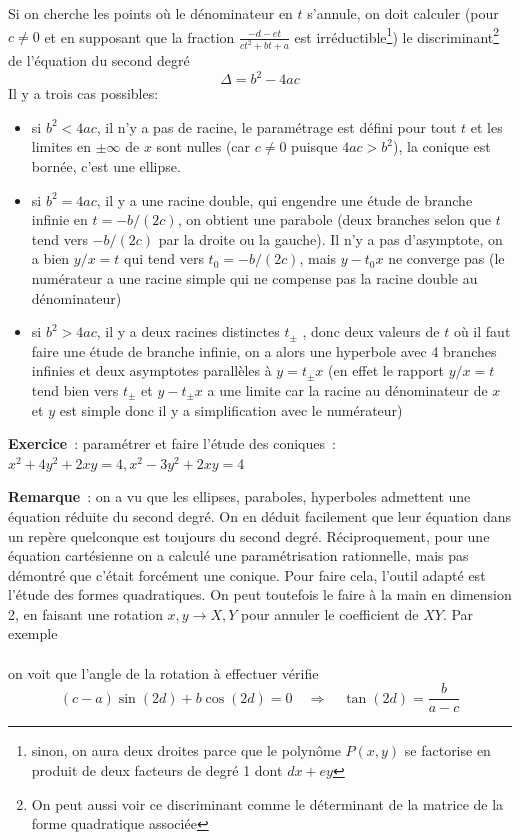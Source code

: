 \documentclass[a4paper,11pt]{article}
\begin{document}
\begin{giacjshere}
Si on cherche les points o\`u le d\'enominateur en $t$ s'annule, on doit
calculer  (pour $c\neq 0$ et en supposant que la fraction
$\frac{-d-et}{ct^2+bt+a}$ est irr\'eductible\footnote{sinon, on 
aura deux droites parce que le
polyn\^ome $P(x,y)$ se factorise en produit de deux facteurs
de degr\'e 1 dont $dx+ey$})
le discriminant\footnote{On peut aussi voir ce discriminant comme le
d\'eterminant de la matrice de la forme quadratique associ\'ee} 
de l'\'equation du second degr\'e
$$ \Delta= b^2-4ac$$
Il y a trois cas possibles: 
\begin{itemize}
\item si $b^2<4ac$, il n'y a pas de racine, le
param\'etrage est d\'efini pour tout $t$ et les limites en $\pm
\infty$ de $x$ sont nulles (car $c \neq 0$ puisque $4ac>b^2$),
la conique est born\'ee, c'est une ellipse.
\item si $b^2=4ac$, il y a une racine double, qui engendre
une \'etude de branche infinie en $t=-b/(2c)$, on
obtient une parabole (deux branches selon que $t$ tend
vers $-b/(2c)$ par la droite ou la gauche). Il n'y a pas
d'asymptote, on a bien $y/x=t$ qui tend vers $t_0=-b/(2c)$,
mais $y-t_0x$ ne converge pas (le num\'erateur a une racine simple
qui ne compense pas la racine double au d\'enominateur)
\item si $b^2>4ac$, il y a deux racines distinctes $t_\pm$ , 
donc deux valeurs de $t$ o\`u il faut faire une \'etude
de branche infinie, on a alors une
hyperbole
avec 4 branches infinies et deux asymptotes parall\`eles \`a
$y=t_\pm x$ (en effet le rapport $y/x=t$ tend bien
vers $t_\pm$ et $y-t_\pm x$ a une limite car la racine au
d\'enominateur de $x$ et $y$ est simple 
donc il y a simplification avec le num\'erateur)
\end{itemize}
{\bf Exercice}~: param\'etrer et faire l'\'etude des coniques~:\\
$x^2+4y^2+2xy=4, x^2-3y^2+2xy=4$

{\bf Remarque}~: 
on a vu que les ellipses, paraboles, hyperboles admettent une
\'equation r\'eduite du second degr\'e. On en d\'eduit facilement que
leur \'equation dans un rep\`ere quelconque est toujours
du second degr\'e. R\'eciproquement, pour une \'equation cart\'esienne
on a calcul\'e une param\'etrisation rationnelle, mais pas
d\'emontr\'e que c'\'etait forc\'ement une conique. Pour faire
cela, l'outil adapt\'e est l'\'etude des formes quadratiques. On peut
toutefois le faire \`a la main en dimension 2, en faisant une rotation
$x,y \rightarrow X,Y$ pour annuler le coefficient de $XY$. Par exemple\\
\\
on voit que l'angle de la rotation \`a effectuer v\'erifie
$$(c-a)\sin(2d)+b\cos(2d)=0 \quad \Rightarrow \quad \tan(2d)=\frac{b}{a-c}$$


\end{giacjshere}
\end{document}
